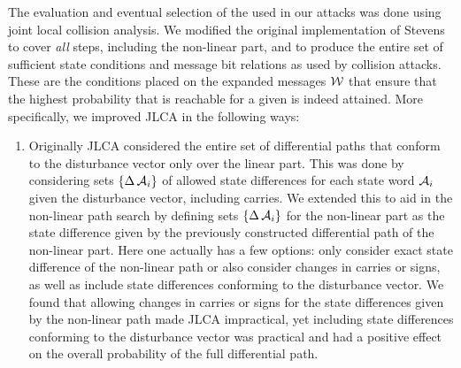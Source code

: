 The evaluation and eventual selection of the \dvs used in our attacks was done using joint local collision analysis. We modified the original implementation of Stevens~\cite{DBLP:conf/eurocrypt/Stevens13}
to cover \emph{all} steps, including the non-linear part, and to produce the entire set of sufficient state conditions and message bit relations as used by collision attacks. These are
the conditions placed on the expanded messages $\mathcal{W}$ that ensure that the highest probability that is reachable for a given \dv is indeed attained.
More specifically, we improved JLCA in the following ways:
\begin{enumerate}
\item Originally JLCA considered the entire set of differential paths that conform to the disturbance vector only
over the linear part. 
This was done by considering sets $\{\operatorname{\Delta}\mathcal{A}_i\}$ of allowed state differences for each state word $\mathcal{A}_i$ given the disturbance vector, including carries.
We extended this to aid in the non-linear path search by defining sets $\{\operatorname{\Delta}\mathcal{A}_i\}$ for the non-linear part as the state difference given by the previously constructed differential path of the non-linear part.
Here one actually has a few options: only consider exact state difference of the non-linear path or also consider changes in carries or signs, as well as include state differences conforming to the disturbance vector.
We found that allowing changes in carries or signs for the state differences given by the non-linear path made JLCA impractical,
yet including state differences conforming to the disturbance vector was practical and had a positive effect on the overall probability of the full differential path.


\end{enumerate}
